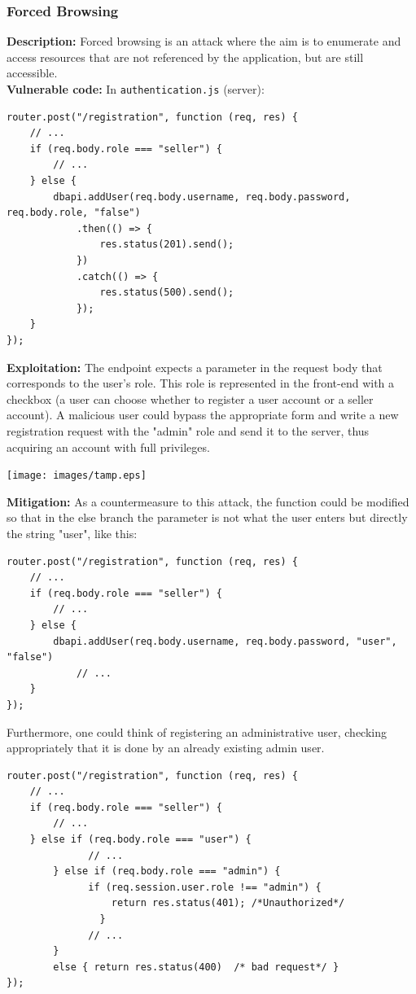 \documentclass[]{article}
\begin{document}
\subsubsection{Forced Browsing}
\textbf{Description:} Forced browsing is an attack where the aim is to enumerate and access resources that are not referenced by the application, but are still accessible. \\ 
\textbf{Vulnerable code:} In \texttt{authentication.js} (server):
\begin{lstlisting}
router.post("/registration", function (req, res) {
    // ...
    if (req.body.role === "seller") {
        // ...
    } else {    
        dbapi.addUser(req.body.username, req.body.password, req.body.role, "false")
            .then(() => {
                res.status(201).send();
            })
            .catch(() => {
                res.status(500).send();
            });
    }
});
\end{lstlisting}
\textbf{Exploitation:} The endpoint expects a parameter in the request body that corresponds to the user's role. This role is represented in the front-end with a checkbox (a user can choose whether to register a user account or a seller account). A malicious user could bypass the appropriate form and write a new registration request with the "admin" role and send it to the server, thus acquiring an account with full privileges.
\begin{center}
\texttt{[image: images/tamp.eps]}
\end{center}
\textbf{Mitigation:} As a countermeasure to this attack, the function could be modified so that in the else branch the parameter is not what the user enters but directly the string "user", like this:
\begin{lstlisting}
router.post("/registration", function (req, res) {
    // ...
    if (req.body.role === "seller") {
        // ...
    } else {    
        dbapi.addUser(req.body.username, req.body.password, "user", "false")
            // ...
    }
});
\end{lstlisting}
Furthermore, one could think of registering an administrative user, checking appropriately that it is done by an already existing admin user.
\begin{lstlisting}
router.post("/registration", function (req, res) {
    // ...
    if (req.body.role === "seller") {
        // ...
    } else if (req.body.role === "user") {
			  // ... 
		} else if (req.body.role === "admin") {
			  if (req.session.user.role !== "admin") {
				  return res.status(401); /*Unauthorized*/
				}
			  // ...
		}
		else { return res.status(400)  /* bad request*/ }
});
\end{lstlisting}
\end{document}
